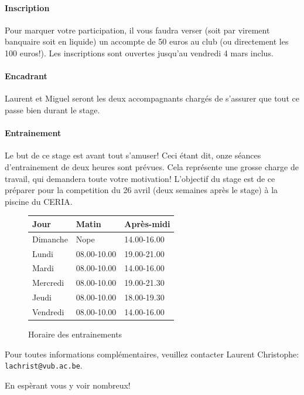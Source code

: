 \documentclass{article}
\begin{document}
\paragraph{Inscription} Pour marquer votre participation, il vous faudra verser (soit par virement banquaire soit en liquide) un accompte de 50 euros au club (ou directement les 100 euros!). Les inscriptions sont ouvertes jusqu'au vendredi 4 mars inclus.

\paragraph{Encadrant} Laurent et Miguel seront les deux accompagnants chargés de s'assurer que tout ce passe bien durant le stage.

\paragraph{Entrainement} Le but de ce stage est avant tout s'amuser! Ceci étant dit, onze séances d'entrainement de deux heures sont prévues. Cela représente une grosse charge de travail, qui demandera toute votre motivation! L'objectif du stage est de ce préparer pour la competition du 26 avril (deux semaines après le stage) à la piscine du CERIA.


\begin{figure}
\vspace{-1cm}
\begin{tabular}{|l|l|l|}
\hline
Jour & Matin & Après-midi \\
\hline
Dimanche & Nope & 14.00-16.00 \\
Lundi & 08.00-10.00 & 19.00-21.00 \\
Mardi & 08.00-10.00 & 14.00-16.00 \\
Mercredi & 08.00-10.00 & 19.00-21.30 \\
Jeudi & 08.00-10.00 & 18.00-19.30 \\
Vendredi & 08.00-10.00 & 14.00-16.00 \\
\hline
\end{tabular}
\caption*{Horaire des entrainements}
\end{figure}

\vspace{1cm}

\hspace{-0.66cm} Pour toutes informations complémentaires, veuillez contacter Laurent Christophe: \texttt{lachrist@vub.ac.be}.

\vspace{0.7cm}

En espèrant vous y voir nombreux!
\end{document}
